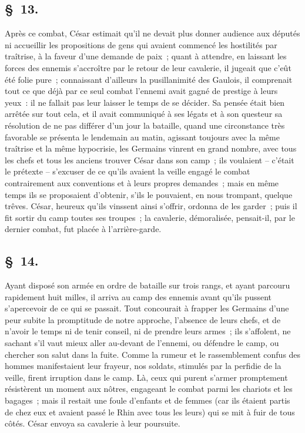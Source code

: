 \documentclass[french,twoside]{book} %
\begin{document}
\subsection[{§ 13.}]{ \textsc{§ 13.} }
\noindent Après ce combat, César estimait qu’il ne devait plus donner audience aux députés ni accueillir les propositions de gens qui avaient commencé les hostilités par traîtrise, à la faveur d’une demande de paix ; quant à attendre, en laissant les forces des ennemis s’accroître par le retour de leur cavalerie, il jugeait que c’eût été folie pure ; connaissant d’ailleurs la pusillanimité des Gaulois, il comprenait tout ce que déjà par ce seul combat l’ennemi avait gagné de prestige à leurs yeux : il ne fallait pas leur laisser le temps de se décider. Sa pensée était bien arrêtée sur tout cela, et il avait communiqué à ses légats et à son questeur sa résolution de ne pas différer d’un jour la bataille, quand une circonstance très favorable se présenta le lendemain au matin, agissant toujours avec la même traîtrise et la même hypocrisie, les Germains vinrent en grand nombre, avec tous les chefs et tous les anciens trouver César dans son camp ; ils voulaient – c’était le prétexte – s’excuser de ce qu’ils avaient la veille engagé le combat contrairement aux conventions et à leurs propres demandes ; mais en même temps ils se proposaient d’obtenir, s’ils le pouvaient, en nous trompant, quelque trêves. César, heureux qu’ils vinssent ainsi s’offrir, ordonna de les garder ; puis il fit sortir du camp toutes ses troupes ; la cavalerie, démoralisée, pensait-il, par le dernier combat, fut placée à l’arrière-garde.
\subsection[{§ 14.}]{ \textsc{§ 14.} }
\noindent Ayant disposé son armée en ordre de bataille sur trois rangs, et ayant parcouru rapidement huit milles, il arriva au camp des ennemis avant qu’ils pussent s’apercevoir de ce qui se passait. Tout concourait à frapper les Germains d’une peur subite la promptitude de notre approche, l’absence de leurs chefs, et de n’avoir le temps ni de tenir conseil, ni de prendre leurs armes ; ils s’affolent, ne sachant s’il vaut mieux aller au-devant de l’ennemi, ou défendre le camp, ou chercher son salut dans la fuite. Comme la rumeur et le rassemblement confus des hommes manifestaient leur frayeur, nos soldats, stimulés par la perfidie de la veille, firent irruption dans le camp. Là, ceux qui purent s’armer promptement résistèrent un moment aux nôtres, engageant le combat parmi les chariots et les bagages ; mais il restait une foule d’enfants et de femmes (car ils étaient partis de chez eux et avaient passé le Rhin avec tous les leurs) qui se mit à fuir de tous côtés. César envoya sa cavalerie à leur poursuite.
\end{document}
